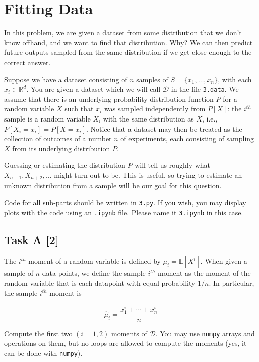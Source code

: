 \chapter{Fitting Data}

\begin{tcolorbox}[title=]
    In this problem, we are given a dataset from some distribution that we don’t
    know offhand, and we want to find that distribution. Why? We can then predict
    future outputs sampled from the same distribution if we get close enough to
    the correct answer.

    Suppose we have a dataset consisting of $n$ samples of $S = \{x_1, \ldots,
    x_n\}$, with each $x_i \in \mathbb{R}^d$. You are given a dataset which we
    will call $\mathcal{D}$ in the file \texttt{3.data}. We assume that there is
    an underlying probability distribution function $P$ for a random variable $X$
    such that $x_i$ was sampled independently from $P[X]$: the $i^{th}$ sample is
    a random variable $X_i$ with the same distribution as $X$, i.e., $P[X_i =
    x_i] = P[X = x_i]$. Notice that a dataset may then be treated as the
    collection of outcomes of a number $n$ of experiments, each consisting of
    sampling $X$ from its underlying distribution $P$.

    Guessing or estimating the distribution $P$ will tell us roughly what $X_{n +
    1},  X_{n + 2}, \ldots$ might turn out to be. This is useful, so trying to
    estimate an unknown distribution from a sample will be our goal for this
    question.

    Code for all sub-parts should be written in \texttt{3.py}. If you wish, you
    may display plots with the code using an \texttt{.ipynb} file. Please name
    it \texttt{3.ipynb} in this case.
\end{tcolorbox}

\section*{\colS{$\S$} Task A \hfill \normalfont \large [2]}

\begin{tcolorbox}
    The $i^{th}$ moment of a random variable is defined by $\mu_i = \mathbb{E}
    [X^i]$. When given a sample of $n$ data points, we define the sample $i^{th}$
    moment as the moment of the random variable that is each datapoint with equal
    probability $1/n$. In particular, the sample $i^{th}$ moment is

    \begin{equation*}
        \hat{\mu}_i = \dfrac{x^i_1 + \cdots + x^i_n}{n}
    \end{equation*}

    Compute the first two $(i = 1, 2)$ moments of $\mathcal{D}$. You may use
    \texttt{numpy} arrays and operations on them, but no loops are allowed to
    compute the moments (yes, it can be done with \texttt{numpy}).
\end{tcolorbox}

